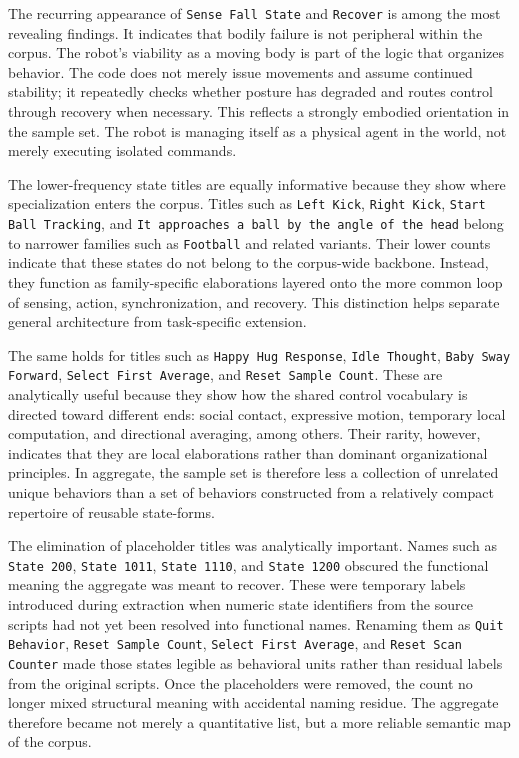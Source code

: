 \documentclass[11pt]{article}
\begin{document}
The recurring appearance of \texttt{Sense Fall State} and
\texttt{Recover} is among the most revealing findings. It indicates
that bodily failure is not peripheral within the corpus. The robot's
viability as a moving body is part of the logic that organizes
behavior. The code does not merely issue movements and assume continued
stability; it repeatedly checks whether posture has degraded and routes
control through recovery when necessary. This reflects a strongly
embodied orientation in the sample set. The robot is managing itself as
a physical agent in the world, not merely executing isolated commands.

The lower-frequency state titles are equally informative because they
show where specialization enters the corpus. Titles such as
\texttt{Left Kick}, \texttt{Right Kick}, \texttt{Start Ball Tracking},
and \texttt{It approaches a ball by the angle of the head} belong to
narrower families such as \texttt{Football} and related variants. Their
lower counts indicate that these states do not belong to the
corpus-wide backbone. Instead, they function as family-specific
elaborations layered onto the more common loop of sensing, action,
synchronization, and recovery. This distinction helps separate general
architecture from task-specific extension.

The same holds for titles such as \texttt{Happy Hug Response},
\texttt{Idle Thought}, \texttt{Baby Sway Forward},
\texttt{Select First Average}, and \texttt{Reset Sample Count}. These
are analytically useful because they show how the shared control
vocabulary is directed toward different ends: social contact,
expressive motion, temporary local computation, and directional
averaging, among others. Their rarity, however, indicates that they are
local elaborations rather than dominant organizational principles. In
aggregate, the sample set is therefore less a collection of unrelated
unique behaviors than a set of behaviors constructed from a relatively
compact repertoire of reusable state-forms.

The elimination of placeholder titles was analytically important.
Names such as \texttt{State 200}, \texttt{State 1011},
\texttt{State 1110}, and \texttt{State 1200} obscured the functional
meaning the aggregate was meant to recover. These were temporary labels
introduced during extraction when numeric state identifiers from the
source scripts had not yet been resolved into functional names.
Renaming them as
\texttt{Quit Behavior}, \texttt{Reset Sample Count},
\texttt{Select First Average}, and \texttt{Reset Scan Counter} made
those states legible as behavioral units rather than residual labels
from the original scripts. Once the placeholders were removed, the
count no longer mixed structural meaning with accidental naming
residue. The aggregate therefore became not merely a quantitative list,
but a more reliable semantic map of the corpus.
\end{document}
